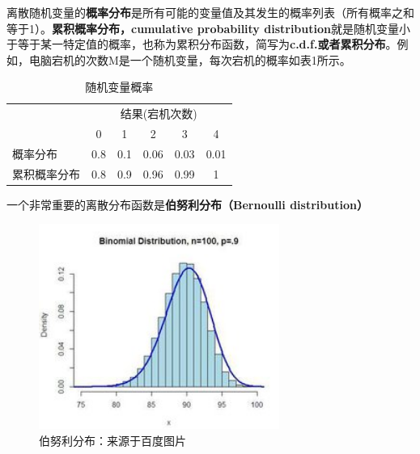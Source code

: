 \documentclass[cn,10pt,math=newtx,citestyle=gb7714-2015,bibstyle=gb7714-2015]{elegantbook}
\begin{document}
	离散随机变量的\textbf{概率分布}是所有可能的变量值及其发生的概率列表（所有概率之和等于1）。\textbf{累积概率分布，cumulative probability distribution}就是随机变量小于等于某一特定值的概率，也称为累积分布函数，简写为\textbf{c.d.f.或者累积分布}。例如，电脑宕机的次数M是一个随机变量，每次宕机的概率如表1所示。
	\begin{center}
		\begin{table}[!h]
			\caption{随机变量概率}\label{tab:digit}
			\begin{center}
				\begin{tabular}{lccccc}
					\hline
					&\multicolumn{5}{c}{结果(宕机次数)}\\
					\cline{2-6}
					&0&1&2&3&4\\
					\cline{1-6}
					概率分布&0.8&0.1&0.06&0.03&0.01\\
					\cline{1-6}
					累积概率分布&0.8&0.9&0.96&0.99&1\\
					\hline
				\end{tabular}
			\end{center}
		\end{table}
	\end{center}
	
	一个非常重要的离散分布函数是\textbf{伯努利分布（Bernoulli distribution）}

\begin{figure}[htbp]
	\centering
	\includegraphics[width=0.7\textwidth]{BF.jpg}
	\caption{伯努利分布：来源于百度图片}
	\label{fig:digit}
\end{figure}
	
\end{document}
